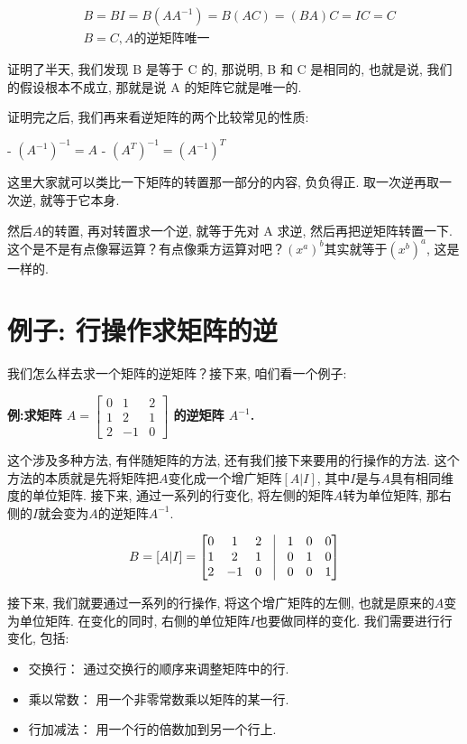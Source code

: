 \begin{align*}
  & B = BI = B(AA^{-1}) = B(AC) = (BA)C = IC = C \\
  & B = C, A\mbox{的逆矩阵唯一}
\end{align*}

证明了半天, 我们发现 B 是等于 C 的, 那说明, B 和 C 是相同的, 也就是说, 我们的假设根本不成立, 那就是说 A 的矩阵它就是唯一的. 

证明完之后, 我们再来看逆矩阵的两个比较常见的性质: 

- $(A^{-1})^{-1} = A$
- $(A^T)^{-1} = (A^{-1})^T$

这里大家就可以类比一下矩阵的转置那一部分的内容, 负负得正. 取一次逆再取一次逆, 就等于它本身. 

然后$A$的转置, 再对转置求一个逆, 就等于先对 A 求逆, 然后再把逆矩阵转置一下. 这个是不是有点像幂运算？有点像乘方运算对吧？$(x^a)^b$其实就等于$(x^b)^a$, 这是一样的. 

\section{例子: 行操作求矩阵的逆}

我们怎么样去求一个矩阵的逆矩阵？接下来, 咱们看一个例子: 

\textbf{例:求矩阵 $A = \begin{bmatrix} 0 & 1 & 2 \\  1 & 2 & 1 \\ 2 & -1 & 0 \end{bmatrix}$ 的逆矩阵 $A^{-1}$.}

这个涉及多种方法, 有伴随矩阵的方法, 还有我们接下来要用的行操作的方法. 这个方法的本质就是先将矩阵把$A$变化成一个增广矩阵$[A|I]$, 其中$I$是与$A$具有相同维度的单位矩阵. 接下来, 通过一系列的行变化, 将左侧的矩阵$A$转为单位矩阵, 那右侧的$I$就会变为$A$的逆矩阵$A^{-1}$.

\begin{align*}
  B = [A|I] =  
  \begin{bmatrix}
    0 & 1 & 2 & \vline & 1 & 0 & 0\\ 
    1 & 2 & 1 & \vline & 0 & 1 & 0 \\
    2 & -1 & 0 & \vline & 0 & 0 & 1
  \end{bmatrix}
\end{align*}

接下来, 我们就要通过一系列的行操作, 将这个增广矩阵的左侧, 也就是原来的$A$变为单位矩阵. 在变化的同时, 右侧的单位矩阵$I$也要做同样的变化. 我们需要进行行变化, 包括:

\begin{itemize}
  \item 交换行： 通过交换行的顺序来调整矩阵中的行. 
  \item 乘以常数： 用一个非零常数乘以矩阵的某一行. 
  \item 行加减法： 用一个行的倍数加到另一个行上. 
\end{itemize}

